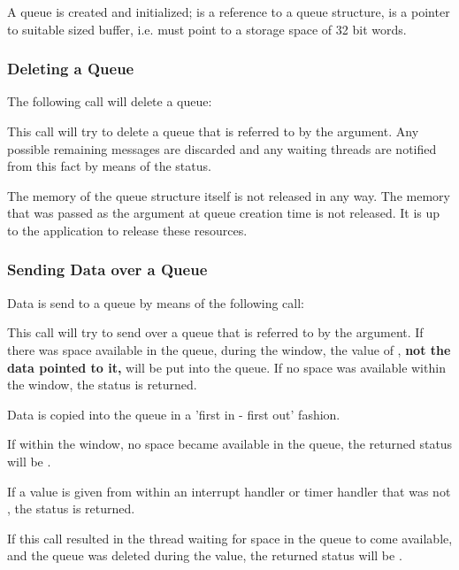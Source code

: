 A queue is created and initialized;  is a reference to a queue structure,
 is a pointer to suitable sized buffer, i.e.  must point to a storage space of
 32 bit words.

\subsubsection{Deleting a Queue}

The following call will delete a queue:


This call will try to delete a queue that is referred to by the  argument. 
Any possible remaining messages are discarded and any waiting threads are notified from
this fact by means of the  status.

The memory of the queue structure itself is not released in any way. The memory that was passed
as the  argument at queue creation time is not released. It is up to the application to release
these resources.

\subsubsection{Sending Data over a Queue}

Data is send to a queue by means of the following call:


This call will try to send  over a queue that is referred to by the
 argument. If there was space available in the queue, during the
 window, the value of , \textbf{not the data
pointed to it,} will be put into the queue. If no space was available within the
 window, the status  is returned. 

Data is copied into the queue in a 'first in - first out' fashion.

If within the  window, no space became available in the queue, the returned status will
be .

If a  value is given from within an interrupt handler or timer handler that was not
, the status  is returned.

If this call resulted in the thread waiting for
space in the queue to come available, and the queue was deleted during the
 value, the returned status will be .

